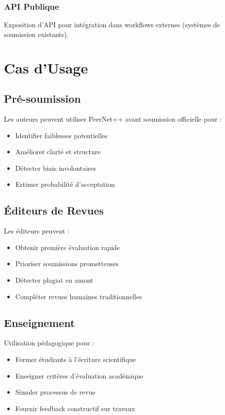 \documentclass[12pt,a4paper]{article}
\begin{document}
\subsubsection{API Publique}
Exposition d'API pour intégration dans workflows externes (systèmes de soumission existants).

\section{Cas d'Usage}

\subsection{Pré-soumission}

Les auteurs peuvent utiliser PeerNet++ avant soumission officielle pour :
\begin{itemize}
    \item Identifier faiblesses potentielles
    \item Améliorer clarté et structure
    \item Détecter biais involontaires
    \item Estimer probabilité d'acceptation
\end{itemize}

\subsection{Éditeurs de Revues}

Les éditeurs peuvent :
\begin{itemize}
    \item Obtenir première évaluation rapide
    \item Prioriser soumissions prometteuses
    \item Détecter plagiat en amont
    \item Compléter revues humaines traditionnelles
\end{itemize}

\subsection{Enseignement}

Utilisation pédagogique pour :
\begin{itemize}
    \item Former étudiants à l'écriture scientifique
    \item Enseigner critères d'évaluation académique
    \item Simuler processus de revue
    \item Fournir feedback constructif sur travaux
\end{itemize}
\end{document}
